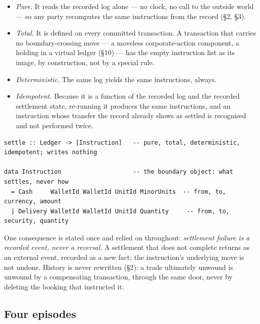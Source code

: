 \begin{itemize}[nosep]
\item \emph{Pure.} It reads the recorded log alone --- no clock, no call to the
outside world --- so any party recomputes the same instructions from the record
(\S2, \S3).
\item \emph{Total.} It is defined on every committed transaction. A transaction
that carries no boundary-crossing move --- a moveless corporate-action component, a
holding in a virtual ledger (\S10) --- has the empty instruction list as its image,
by construction, not by a special rule.
\item \emph{Deterministic.} The same log yields the same instructions, always.
\item \emph{Idempotent.} Because it is a function of the recorded log and the
recorded settlement state, re-running it produces the same instructions, and an
instruction whose transfer the record already shows as settled is recognised and
not performed twice.
\end{itemize}

\begin{lstlisting}
settle :: Ledger -> [Instruction]   -- pure, total, deterministic, idempotent; writes nothing

data Instruction                    -- the boundary object: what settles, never how
  = Cash     WalletId WalletId UnitId MinorUnits  -- from, to, currency, amount
  | Delivery WalletId WalletId UnitId Quantity     -- from, to, security, quantity
\end{lstlisting}

One consequence is stated once and relied on throughout: \emph{settlement failure
is a recorded event, never a reversal}. A settlement that does not complete returns
as an external event, recorded as a new fact; the instruction's underlying move is
not undone. History is never rewritten (\S2): a trade ultimately unwound is unwound
by a compensating transaction, through the same door, never by deleting the booking
that instructed it.

\subsection{Four episodes}

